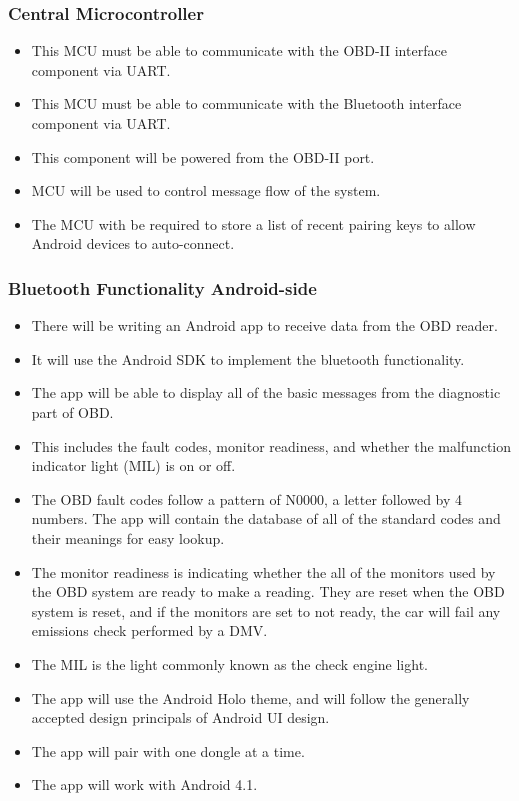 \documentclass[12pt,letterpaper]{article}
\begin{document}
\subsubsection{Central Microcontroller}
\begin{itemize}
	\item This MCU must be able to communicate with the OBD-II interface component via UART.
	\item This MCU must be able to communicate with the Bluetooth interface component via UART.
	\item This component will be powered from the OBD-II port.
	\item MCU will be used to control message flow of the system.
	\item The MCU with be required to store a list of recent pairing keys to allow Android devices to auto-connect.
\end{itemize} 

\subsubsection{Bluetooth Functionality Android-side}
\begin{itemize}
	\item There will be writing an Android app to receive data from the OBD reader.
	\item It will use the Android SDK to implement the bluetooth functionality.
	\item The app will be able to display all of the basic messages from the diagnostic part of OBD.
	\item This includes the fault codes, monitor readiness, and whether the malfunction indicator light (MIL) is on or off.
	\item The OBD fault codes follow a pattern of N0000, a letter followed by 4 numbers. The app will contain the database of all of the standard codes and their meanings for easy lookup. 
	\item  The monitor readiness is indicating whether the all of the monitors used by the OBD system are ready to make a reading. They are reset when the OBD system is reset, and if the monitors are set to not ready, the car will fail any emissions check performed by a DMV. 
	\item The MIL is the light commonly known as the check engine light. 
	\item The app will use the Android Holo theme, and will follow the generally accepted design principals of Android UI design.
	\item The app will pair with one dongle at a time.
	\item The app will work with Android 4.1.

\end{itemize}
\end{document}
